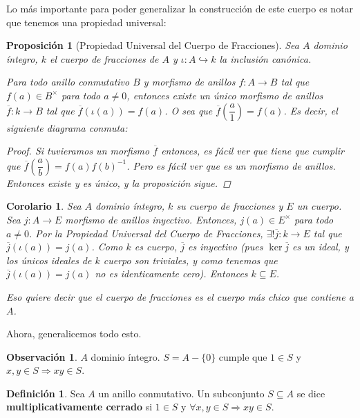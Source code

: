 \documentclass[12pt]{book}
\newtheorem{prop}[teo]{Proposición}
\newtheorem{cor}[teo]{Corolario}
\theoremstyle{definition}
\newtheorem{obs}[teo]{Observación}
\newtheorem{defn}[teo]{Definición}
\begin{document}
Lo más importante para poder generalizar la construcción de este cuerpo es notar que tenemos una propiedad universal:

\begin{prop}[Propiedad Universal del Cuerpo de Fracciones]

Sea $A$ dominio íntegro, $k$ el cuerpo de fracciones de $A$ y $\iota:A \hookrightarrow k$ la inclusión canónica.

Para todo anillo conmutativo $B$ y morfismo de anillos $f:A\to B$ tal que $f(a)\in B^\times$ para todo $a\neq 0$, entonces existe un único morfismo de anillos $\overline{f}:k\to B$ tal que $\overline{f}(\iota(a))=f(a)$. O sea que $\overline{f}\left(\dfrac{a}{1}\right) = f(a)$. Es decir, el siguiente diagrama conmuta:
\begin{proof}
Si tuvieramos un morfismo $\overline{f}$ entonces, es fácil ver que tiene que cumplir que $\overline{f}\left(\dfrac{a}{b}\right) = f(a) f(b)^{-1}$. Pero es fácil ver que es un morfismo de anillos. Entonces existe y es único, y la proposición sigue.
\end{proof}
\end{prop}

\begin{cor}
Sea $A$ dominio íntegro, $k$ su cuerpo de fracciones y $E$ un cuerpo. Sea $j:A\to E$ morfismo de anillos inyectivo. Entonces, $j(a)\in E^\times$ para todo $a\neq 0$. Por la Propiedad Universal del Cuerpo de Fracciones, $\exists ! \overline{j}:k\to E$ tal que $\overline{j}(\iota(a)) = j(a)$. Como $k$ es cuerpo, $\overline{j}$ es inyectivo (pues $\ker \overline{j}$ es un ideal, y los únicos ideales de $k$ cuerpo son triviales, y como tenemos que $\overline{j}({\iota}(a))=j(a)$ no es identicamente cero). Entonces $k\subseteq E$.

Eso quiere decir que el cuerpo de fracciones es el cuerpo más chico que contiene a $A$.
\end{cor}

Ahora, generalicemos todo esto.
\begin{obs}
$A$ dominio íntegro. $S=A-\{0\}$ cumple que $1\in S$ y $x,y\in S\Longrightarrow xy\in S$.
\end{obs}
\begin{defn}
Sea $A$ un anillo conmutativo. Un subconjunto $S\subseteq A$ se dice \textbf{multiplicativamente cerrado} si $1\in S$ y $\forall x,y\in S\Longrightarrow xy\in S$.
\end{defn}
\end{document}
